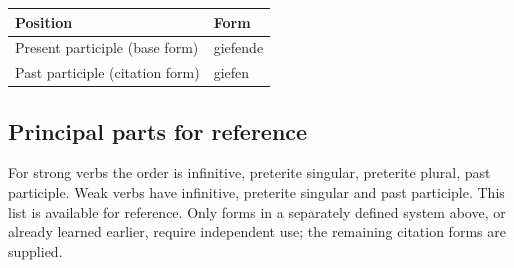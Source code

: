 \par\begingroup
\fontsize{10.5}{13.2}\selectfont
\setlength{\LTleft}{0pt}\setlength{\LTright}{\fill}
\noindent
\begin{tabular}{@{}>{\raggedright\arraybackslash}p{80.04mm}>{\raggedright\arraybackslash}p{41.15mm}@{}}
\toprule
\textbf{Position} & \textbf{Form} \\
\midrule
Present participle (base form) & giefende \\
Past participle (citation form) & giefen \\
\bottomrule
\end{tabular}
\par\endgroup

\subsection*{Principal parts for reference}

For strong verbs the order is infinitive, preterite singular, preterite plural, past participle. Weak verbs have infinitive, preterite singular and past participle. This list is available for reference. Only forms in a separately defined system above, or already learned earlier, require independent use; the remaining citation forms are supplied.

